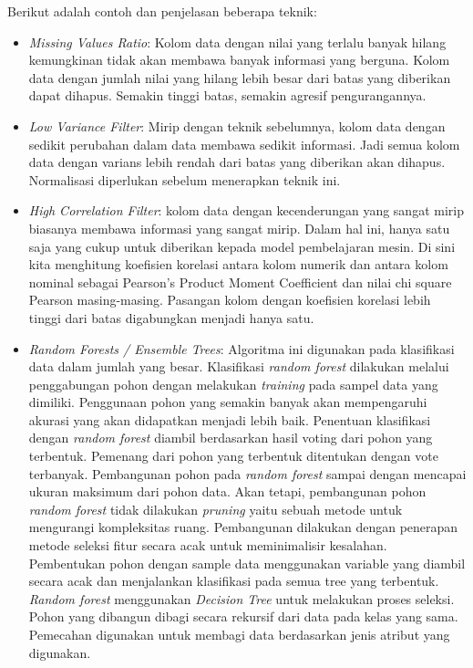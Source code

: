 \documentclass[a4paper,twoside]{article}
\begin{document}
\begin{enumerate}
Berikut adalah contoh dan penjelasan beberapa teknik:

\begin{itemize}

\item \textit{Missing Values Ratio}: Kolom data dengan nilai yang terlalu banyak hilang kemungkinan tidak akan membawa banyak informasi yang berguna. Kolom data dengan jumlah nilai yang hilang lebih besar dari batas yang diberikan dapat dihapus. Semakin tinggi batas, semakin agresif pengurangannya.

\item \textit{Low Variance Filter}: Mirip dengan teknik sebelumnya, kolom data dengan sedikit perubahan dalam data membawa sedikit informasi. Jadi semua kolom data dengan varians lebih rendah dari batas yang diberikan akan dihapus. Normalisasi diperlukan sebelum menerapkan teknik ini.

\item \textit{High Correlation Filter}: kolom data dengan kecenderungan yang sangat mirip biasanya membawa informasi yang sangat mirip. Dalam hal ini, hanya satu saja yang cukup untuk diberikan kepada model pembelajaran mesin. Di sini kita menghitung koefisien korelasi antara kolom numerik dan antara kolom nominal sebagai Pearson's Product Moment Coefficient dan nilai chi square Pearson masing-masing. Pasangan kolom dengan koefisien korelasi lebih tinggi dari batas digabungkan menjadi hanya satu.

\item \textit{Random Forests / Ensemble Trees}: Algoritma ini digunakan pada klasifikasi data dalam jumlah yang besar. Klasifikasi \textit{random forest} dilakukan melalui penggabungan pohon dengan melakukan \textit{training} pada sampel data yang dimiliki. Penggunaan pohon yang semakin banyak akan mempengaruhi akurasi yang akan didapatkan menjadi lebih baik. Penentuan klasifikasi dengan \textit{random forest} diambil berdasarkan hasil voting dari pohon yang terbentuk. Pemenang dari pohon yang terbentuk ditentukan dengan vote terbanyak. Pembangunan pohon  pada \textit{random forest} sampai dengan mencapai ukuran maksimum dari pohon data. Akan tetapi, pembangunan pohon \textit{random forest} tidak dilakukan  \textit{pruning} yaitu sebuah metode untuk mengurangi kompleksitas ruang. Pembangunan dilakukan dengan penerapan metode seleksi fitur secara acak untuk meminimalisir kesalahan. Pembentukan pohon  dengan sample data menggunakan variable yang diambil secara acak dan menjalankan klasifikasi pada semua tree yang terbentuk. \textit{Random forest} menggunakan \textit{Decision Tree} untuk melakukan proses seleksi. Pohon yang dibangun dibagi secara rekursif dari data pada kelas yang sama. Pemecahan  digunakan untuk membagi data berdasarkan jenis atribut yang digunakan.


\end{itemize}
\end{enumerate}
\end{document}
